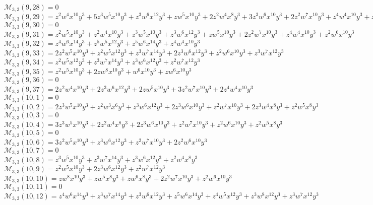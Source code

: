 \documentclass[12pt]{memoireuqam1.3}
\begin{document}
$\mathcal{M}_{3,3}(9,28)=0$\\
$\mathcal{M}_{3,3}(9,29)=z^2w^4x^{10}y^3+5z^3w^5x^{10}y^3+z^3w^6x^{12}y^3+zw^5x^{10}y^3+2z^2w^4x^8y^3+3z^3w^6x^{10}y^3+2z^2w^7x^{10}y^3+z^4w^4x^{10}y^3+z^2w^5x^8y^3$\\
$\mathcal{M}_{3,3}(9,30)=0$\\
$\mathcal{M}_{3,3}(9,31)=z^2w^5x^{10}y^3+z^2w^4x^{10}y^3+z^3w^5x^{10}y^3+z^3w^6x^{12}y^3+zw^5x^{10}y^3+2z^2w^7x^{10}y^3+z^4w^4x^{10}y^3+z^2w^6x^{10}y^3$\\
$\mathcal{M}_{3,3}(9,32)=z^4w^6x^{14}y^3+z^5w^5x^{12}y^3+z^5w^6x^{14}y^3+z^4w^4x^{10}y^3$\\
$\mathcal{M}_{3,3}(9,33)=2z^2w^5x^{10}y^3+z^2w^5x^{12}y^3+z^3w^7x^{14}y^3+2z^3w^6x^{12}y^3+z^2w^6x^{10}y^3+z^3w^7x^{12}y^3$\\
$\mathcal{M}_{3,3}(9,34)=z^2w^5x^{12}y^3+z^3w^7x^{14}y^3+z^3w^6x^{12}y^3+z^2w^7x^{12}y^3$\\
$\mathcal{M}_{3,3}(9,35)=z^2w^5x^{10}y^3+2zw^8x^{10}y^3+w^6x^{10}y^3+zw^6x^{10}y^3$\\
$\mathcal{M}_{3,3}(9,36)=0$\\
$\mathcal{M}_{3,3}(9,37)=2z^2w^4x^{10}y^3+2z^3w^6x^{12}y^3+2zw^5x^{10}y^3+3z^2w^7x^{10}y^3+2z^4w^4x^{10}y^3$\\
$\mathcal{M}_{3,3}(10,1)=0$\\
$\mathcal{M}_{3,3}(10,2)=2z^3w^5x^{10}y^3+z^2w^3x^6y^3+z^3w^6x^{12}y^3+2z^3w^6x^{10}y^3+z^2w^7x^{10}y^3+2z^3w^4x^8y^3+z^2w^5x^8y^3$\\
$\mathcal{M}_{3,3}(10,3)=0$\\
$\mathcal{M}_{3,3}(10,4)=3z^3w^5x^{10}y^3+2z^2w^4x^8y^3+2z^3w^6x^{10}y^3+z^2w^7x^{10}y^3+z^2w^6x^{10}y^3+z^2w^5x^8y^3$\\
$\mathcal{M}_{3,3}(10,5)=0$\\
$\mathcal{M}_{3,3}(10,6)=3z^2w^5x^{10}y^3+z^3w^6x^{12}y^3+z^2w^7x^{10}y^3+2z^2w^6x^{10}y^3$\\
$\mathcal{M}_{3,3}(10,7)=0$\\
$\mathcal{M}_{3,3}(10,8)=z^3w^5x^{10}y^3+z^3w^7x^{14}y^3+z^3w^6x^{12}y^3+z^2w^4x^8y^3$\\
$\mathcal{M}_{3,3}(10,9)=z^2w^5x^{10}y^3+2z^3w^6x^{12}y^3+z^2w^7x^{12}y^3$\\
$\mathcal{M}_{3,3}(10,10)=zw^8x^{10}y^3+zw^5x^8y^3+zw^6x^8y^3+2z^2w^7x^{10}y^3+z^2w^6x^{10}y^3$\\
$\mathcal{M}_{3,3}(10,11)=0$\\
$\mathcal{M}_{3,3}(10,12)=z^4w^6x^{14}y^3+z^3w^7x^{14}y^3+z^3w^6x^{12}y^3+z^5w^6x^{14}y^3+z^4w^5x^{12}y^3+z^3w^8x^{12}y^3+z^3w^7x^{12}y^3$\\
\end{document}
